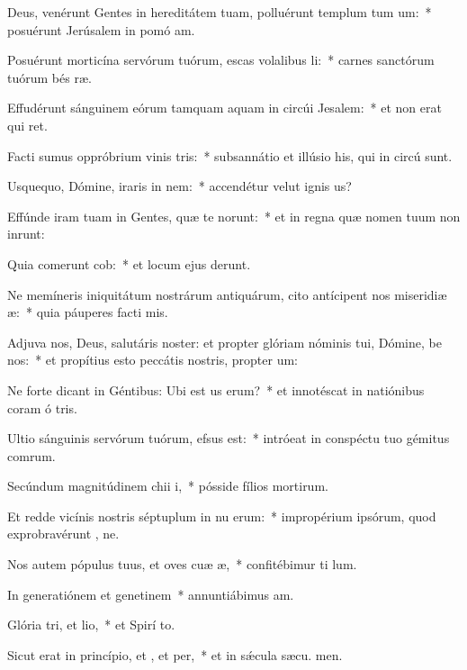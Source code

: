 \item Deus, venérunt Gentes in hereditátem tuam, polluérunt templum tum um:~* posuérunt Jerúsalem in pomó am.
\item Posuérunt morticína servórum tuórum, escas volalibus li:~* carnes sanctórum tuórum bés ræ.
\item Effudérunt sánguinem eórum tamquam aquam in circúi Jesalem:~* et non erat qui ret.
\item Facti sumus oppróbrium vinis tris:~* subsannátio et illúsio his, qui in circú  sunt.
\item Usquequo, Dómine, iraris in nem:~* accendétur velut ignis  us?
\item Effúnde iram tuam in Gentes, quæ te  norunt:~* et in regna quæ nomen tuum non inrunt:
\item Quia comerunt cob:~* et locum ejus derunt.
\item Ne memíneris iniquitátum nostrárum antiquárum, cito antícipent nos miseridiæ æ:~* quia páuperes facti  mis.
\item Adjuva nos, Deus, salutáris noster: et propter glóriam nóminis tui, Dómine, be nos:~* et propítius esto peccátis nostris, propter  um:
\item Ne forte dicant in Géntibus: Ubi est us erum?~* et innotéscat in natiónibus coram ó tris.
\item Ultio sánguinis servórum tuórum,  efsus est:~* intróeat in conspéctu tuo gémitus comrum.
\item Secúndum magnitúdinem chii i,~* pósside fílios mortirum.
\item Et redde vicínis nostris séptuplum in nu erum:~* impropérium ipsórum, quod exprobravérunt , ne.
\item Nos autem pópulus tuus, et oves cuæ æ,~* confitébimur ti  lum.
\item In generatiónem et genetinem~* annuntiábimus  am.
\item Glória tri, et lio,~* et Spirí to.
\item Sicut erat in princípio, et , et per,~* et in sǽcula sæcu. men.
